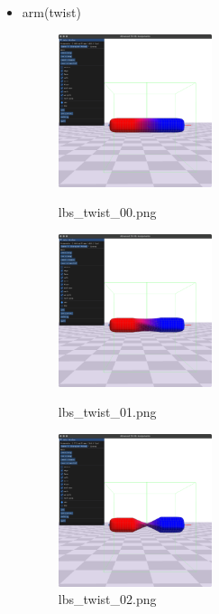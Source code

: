 \documentclass[a4paper,10pt,uplatex,dvipdfmx]{jsarticle}
\begin{document}
\begin{itemize}
  \item arm(twist)
  \begin{figure}[H]
    \begin{minipage}{0.33\hsize}
      \begin{center}
        \includegraphics[width=45mm]{img/lbs_twist_00.png}
        \caption{lbs\_twist\_00.png}
      \end{center}
    \end{minipage}
    \begin{minipage}{0.33\hsize}
      \begin{center}
        \includegraphics[width=45mm]{img/lbs_twist_01.png}
        \caption{lbs\_twist\_01.png}
      \end{center}
    \end{minipage}
    \begin{minipage}{0.33\hsize}
      \begin{center}
        \includegraphics[width=45mm]{img/lbs_twist_02.png}
        \caption{lbs\_twist\_02.png}
      \end{center}
    \end{minipage}
  \end{figure}


\end{itemize}
\end{document}
